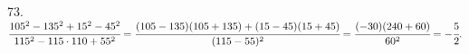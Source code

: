 73. $\cfrac{105^2-135^2+15^2-45^2}{115^2-115\cdot110+55^2}=\cfrac{(105-135)(105+135)+(15-45)(15+45)}{(115-55)^2}=
\cfrac{(-30)(240+60)}{60^2}=-\cfrac{5}{2}.$\\
